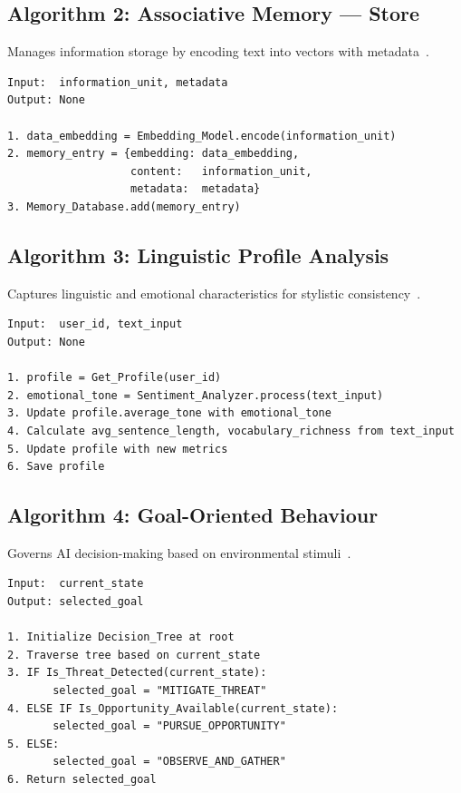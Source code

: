 \subsection{Algorithm 2: Associative Memory --- Store}

Manages information storage by encoding text into vectors with metadata~\cite{liu2022}.

\begin{verbatim}
Input:  information_unit, metadata
Output: None

1. data_embedding = Embedding_Model.encode(information_unit)
2. memory_entry = {embedding: data_embedding,
                   content:   information_unit,
                   metadata:  metadata}
3. Memory_Database.add(memory_entry)
\end{verbatim}

\subsection{Algorithm 3: Linguistic Profile Analysis}

Captures linguistic and emotional characteristics for stylistic consistency~\cite{mikros2023}.

\begin{verbatim}
Input:  user_id, text_input
Output: None

1. profile = Get_Profile(user_id)
2. emotional_tone = Sentiment_Analyzer.process(text_input)
3. Update profile.average_tone with emotional_tone
4. Calculate avg_sentence_length, vocabulary_richness from text_input
5. Update profile with new metrics
6. Save profile
\end{verbatim}

\subsection{Algorithm 4: Goal-Oriented Behaviour}

Governs AI decision-making based on environmental stimuli~\cite{park2023generative}.

\begin{verbatim}
Input:  current_state
Output: selected_goal

1. Initialize Decision_Tree at root
2. Traverse tree based on current_state
3. IF Is_Threat_Detected(current_state):
       selected_goal = "MITIGATE_THREAT"
4. ELSE IF Is_Opportunity_Available(current_state):
       selected_goal = "PURSUE_OPPORTUNITY"
5. ELSE:
       selected_goal = "OBSERVE_AND_GATHER"
6. Return selected_goal
\end{verbatim}

